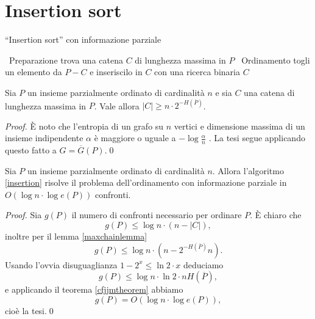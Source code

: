 \section{Insertion sort} 
\begin{algorithm}
	\caption{``Insertion sort'' con informazione parziale} \label{insertion} 
	\begin{algorithmic}
		[1] \STATE \, \COMMENT Preparazione \STATE trova una catena \(C\) di lunghezza massima in \(P\) \STATE \, \COMMENT Ordinamento  \STATE togli un elemento da \(P-C\) e inseriscilo in \(C\) con una ricerca binaria \ENDWHILE \RETURN \(C\) 
	\end{algorithmic}
\end{algorithm}
\begin{lemma}
	\label{maxchainlemma} Sia \(P\) un insieme parzialmente ordinato di cardinalità \(n\) e sia \(C\) una catena di lunghezza massima in \(P\). Vale allora \(\left|C\right|\ge n\cdot2^{-H(\overline{P})}\). 
\end{lemma}
\begin{proof}
	È noto che l'entropia di un grafo su \(n\) vertici e dimensione massima di un insieme indipendente \(\alpha\) è maggiore o uguale a \(-\log{\frac{\alpha}{n}}\) \cite{Cardinal2005}. La tesi segue applicando questo fatto a \(G=\overline{G}(P)\).\qed 
\end{proof}
\begin{theorem}
	Sia \(P\) un insieme parzialmente ordinato di cardinalità \(n\). Allora l'algoritmo \ref{insertion} risolve il problema dell'ordinamento con informazione parziale in \(O(\log{n}\cdot\log{e(P)})\) confronti. 
\end{theorem}
\begin{proof}
	Sia \(g(P)\) il numero di confronti necessario per ordinare \(P\). È chiaro che
	\[g(P)\le \log{n}\cdot(n-|C|),\]
	inoltre per il lemma \ref{maxchainlemma}
	\[g(P)\le\log{n}\cdot(n-2^{-H(\overline{P})}n).\]
	Usando l'ovvia disuguaglianza \(1-2^{x}\le\ln{2}\cdot x\) deduciamo
	\[g(P)\le\log{n}\cdot\ln{2}\cdot nH(\overline{P}),\]
	e applicando il teorema \ref{cfjjmtheorem} abbiamo
	\[g(P)=O(\log{n}\cdot\log{e(P)}),\]
	cioè la tesi.\qed 
\end{proof}

